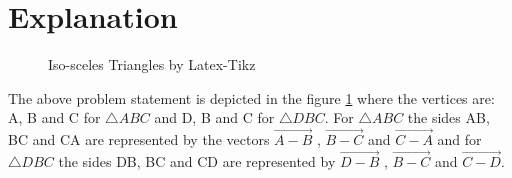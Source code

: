 \documentclass[journal,12pt,twocolumn]{IEEEtran}
\begin{document}
\section{Explanation}
\begin{figure}[!ht]
\centering
\resizebox{\columnwidth}{!}{}
\caption{Iso-sceles Triangles by Latex-Tikz}
\label{fig:iso_scelen}	
\end{figure}

The above problem statement is depicted in the figure \ref{fig:iso_scelen} where the vertices are: A, B and C for $\triangle ABC$ and D, B and C for $\triangle DBC$. For $\triangle ABC$ the sides AB, BC and CA are represented by the vectors $\vec{A-B}$ , $\vec{B-C}$ and $\vec{C-A}$ and for $\triangle DBC$ the sides DB, BC and CD are represented by $\vec{D-B}$ , $\vec{B-C}$ and $\vec{C-D}$.
\end{document}
